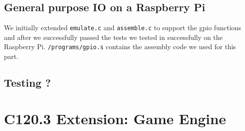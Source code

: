 \documentclass[11pt]{article}
\begin{document}
\subsection{General purpose IO on a Raspberry Pi}
We initially extended \texttt{emulate.c} and \texttt{assemble.c} to support the gpio functions and after we successfully passed the tests we tested in successfully on the Raspberry Pi. \texttt{/programs/gpio.s} contains the assembly code we used for this part.

\subsection{Testing ?}

\vspace{4mm}

\section{C120.3 Extension: Game Engine}
\end{document}
